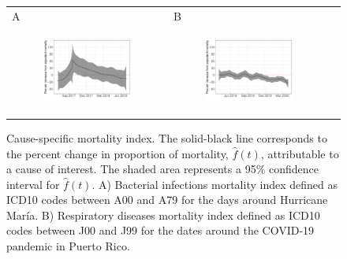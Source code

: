 \documentclass[11pt]{article}
\begin{document}
\begin{figure}[ht]
	\begin{tabular}{lll}
	A&B\\
	\begin{subfigure}[t]{0.49\linewidth}
		\centering
		\includegraphics[width=1\linewidth]{figs/figure-4a.pdf} 
	\end{subfigure}&
	\begin{subfigure}[t]{0.49\linewidth}
		\centering
		\includegraphics[width=1\linewidth]{figs/figure-4b.pdf}
	\end{subfigure}&\\
    \end{tabular}
	\caption{Cause-specific mortality index. The solid-black line corresponds to the percent change in proportion of mortality, $\hat{f}(t)$, attributable to a cause of interest. The shaded area represents a 95\% confidence interval for $\hat{f}(t)$. A) Bacterial infections mortality index defined as ICD10 codes between A00 and A79 for the days around Hurricane Mar\'ia. B) Respiratory diseases mortality index defined as ICD10 codes between J00 and J99 for the dates around the COVID-19 pandemic in Puerto Rico.}
	\label{fig:mortality-index}
\end{figure}
\end{document}
